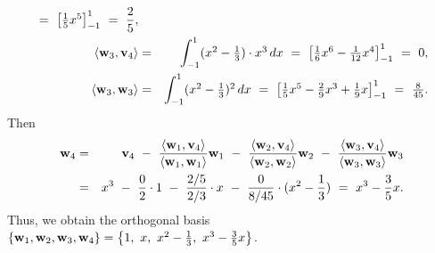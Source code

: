 \begin{solution}
\begin{eqnarray*}
    ~=~ \bigbracket{\textstyle\frac{1}{5}x^5}_{-1}^{1}
    ~=~ \frac{2}{5},
    \\
    \iprod{\vect{w}_3,\vect{v}_4}
    &=& \int_{-1}^{1}\textstyle (x^2-\frac{1}{3})\cdot x^3\,dx
    ~=~ \bigbracket{\textstyle\frac{1}{6}x^6 - \frac{1}{12}x^4}_{-1}^{1}
    ~=~ 0,
    \\
    \iprod{\vect{w}_3,\vect{w}_3}
    &=& \int_{-1}^{1}\textstyle (x^2-\frac{1}{3})^2\,dx
    ~=~ \bigbracket{\textstyle\frac{1}{5}x^5-\frac{2}{9}x^3+\frac{1}{9}x}_{-1}^{1}
    ~=~ \frac{8}{45}.
  \end{eqnarray*}
  Then
  \begin{eqnarray*}
    \vect{w}_4
    &=& \vect{v}_4
        ~-~ \frac{\iprod{\vect{w}_1,\vect{v}_4}}{\iprod{\vect{w}_1,\vect{w}_1}}\vect{w}_1
        ~-~ \frac{\iprod{\vect{w}_2,\vect{v}_4}}{\iprod{\vect{w}_2,\vect{w}_2}}\vect{w}_2
        ~-~ \frac{\iprod{\vect{w}_3,\vect{v}_4}}{\iprod{\vect{w}_3,\vect{w}_3}}\vect{w}_3
    \\
    &=& x^3 ~-~ \frac{0}{2}\cdot 1 ~-~ \frac{2/5}{2/3}\cdot x ~-~ \frac{0}{8/45}\cdot(x^2-\frac{1}{3})
        ~=~ x^3 - \frac{3}{5}x.
  \end{eqnarray*}
  Thus, we obtain the orthogonal basis $\set{\vect{w}_1,\vect{w}_2,\vect{w}_3,\vect{w}_4} =
  \set{1,~ x,~ x^2-\frac{1}{3},~ x^3 - \frac{3}{5}x}$.
\end{solution}

